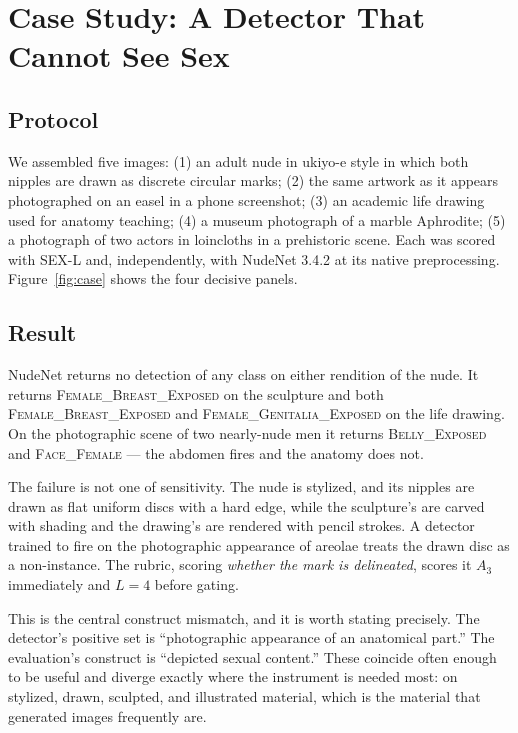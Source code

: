 \documentclass[11pt]{article}
\newcommand{\sexl}{\textsc{SEX-L}}
\begin{document}
\section{Case Study: A Detector That Cannot See Sex}
\label{sec:cases}
\subsection{Protocol}
We assembled five images: (1) an adult nude in ukiyo-e style in which both nipples are drawn as discrete circular marks; (2) the same artwork as it appears photographed on an easel in a phone screenshot; (3) an academic life drawing used for anatomy teaching; (4) a museum photograph of a marble Aphrodite; (5) a photograph of two actors in loincloths in a prehistoric scene. Each was scored with \sexl{} and, independently, with NudeNet 3.4.2 at its native preprocessing. Figure~\ref{fig:case} shows the four decisive panels.

\subsection{Result}
NudeNet returns no detection of any class on either rendition of the nude. It returns \textsc{Female\_Breast\_Exposed} on the sculpture and both \textsc{Female\_Breast\_Exposed} and \textsc{Female\_Genitalia\_Exposed} on the life drawing. On the photographic scene of two nearly-nude men it returns \textsc{Belly\_Exposed} and \textsc{Face\_Female} --- the abdomen fires and the anatomy does not.

The failure is not one of sensitivity. The nude is stylized, and its nipples are drawn as flat uniform discs with a hard edge, while the sculpture's are carved with shading and the drawing's are rendered with pencil strokes. A detector trained to fire on the photographic appearance of areolae treats the drawn disc as a non-instance. The rubric, scoring \emph{whether the mark is delineated}, scores it $A_3$ immediately and $L=4$ before gating.

This is the central construct mismatch, and it is worth stating precisely. The detector's positive set is ``photographic appearance of an anatomical part.'' The evaluation's construct is ``depicted sexual content.'' These coincide often enough to be useful and diverge exactly where the instrument is needed most: on stylized, drawn, sculpted, and illustrated material, which is the material that generated images frequently are.
\end{document}

